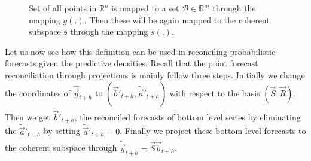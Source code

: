 \documentclass[graybox]{svmult}
\begin{document}
\begin{figure}[H]
	\begin{center}
			\newline
		\caption{Set of all points in $\mathbb{R}^n$ is mapped to a set $\mathcal{B} \in \mathbb{R}^m$ through the mapping $g(.)$. Then these will be again mapped to the coherent subspace $\mathfrak{s}$ through the mapping $s(.)$.}\label{fig3}
	\end{center}
	
\end{figure}


Let us now see how this definition can be used in reconciling probabilistic forecasts given the predictive densities. Recall that the point forecast reconciliation through projections is mainly follow three steps. Initially we change the coordinates of $\hat{\vec{y}}_{t+h}$ to $(\tilde{\vec{b}}'_{t+h}, \tilde{\vec{a}}'_{t+h})$ with respect to the basis $(\vec{S} ~ ~ \vec{R})$. Then we get $\tilde{\vec{b}}'_{t+h}$, the reconciled forecasts of bottom level series by eliminating the $\tilde{\vec{a}}'_{t+h}$ by setting $\tilde{\vec{a}}'_{t+h}=0$. Finally we project these bottom level forecasts to the coherent subspace through $\tilde{\vec{y}}_{t+h}=\vec{S}\tilde{\vec{b}}_{t+h}$.   
\end{document}
